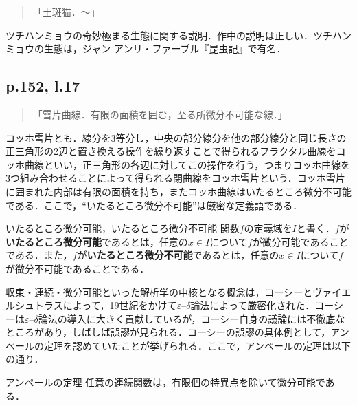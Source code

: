 \documentclass[10pt, a5paper, twoside]{ltjsarticle}
\begin{document}
            \begin{quote}
                「土斑猫．〜」
            \end{quote}

            ツチハンミョウの奇妙極まる生態に関する説明．作中の説明は正しい．ツチハンミョウの生態は，ジャン-アンリ・ファーブル『昆虫記』\cite{fabre}で有名．

        \subsection{p.152, l.17}

            \begin{quote}
                「雪片曲線．有限の面積を囲む，至る所微分不可能な線．」
            \end{quote}

            コッホ雪片とも．線分を3等分し，中央の部分線分を他の部分線分と同じ長さの正三角形の2辺と置き換える操作を繰り返すことで得られるフラクタル曲線をコッホ曲線といい，正三角形の各辺に対してこの操作を行う，つまりコッホ曲線を3つ組み合わせることによって得られる閉曲線をコッホ雪片という．コッホ雪片に囲まれた内部は有限の面積を持ち，またコッホ曲線はいたるところ微分不可能である．ここで，“いたるところ微分不可能”は厳密な定義語である．

            \begin{dfn}{いたるところ微分可能，いたるところ微分不可能}{}
                関数$f$の定義域を$I$と書く．$f$が\textbf{いたるところ微分可能}であるとは，任意の$x \in I$について$f$が微分可能であることである．また，$f$が\textbf{いたるところ微分不可能}であるとは，任意の$x \in I$について$f$が微分不可能であることである．
            \end{dfn}

            収束・連続・微分可能といった解析学の中核となる概念は，コーシーとヴァイエルシュトラスによって，19世紀をかけて$\varepsilon$--$\delta$論法によって厳密化された．コーシーは$\varepsilon$--$\delta$論法の導入に大きく貢献しているが，コーシー自身の議論には不徹底なところがあり，しばしば誤謬が見られる．コーシーの誤謬の具体例として，アンペールの定理を認めていたことが挙げられる\cite{nakane}．ここで，アンペールの定理は以下の通り．

            \begin{clm}{アンペールの定理}{}
                任意の連続関数は，有限個の特異点を除いて微分可能である．
            \end{clm}
\end{document}
